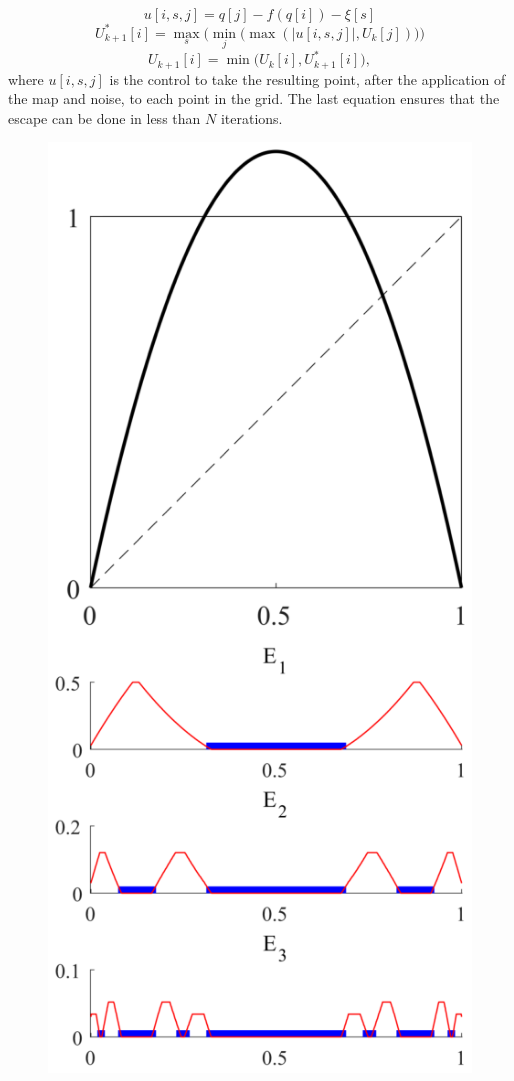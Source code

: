 \begin{equation*}
u[i,s,j] = q[j] - f(q[i]) - \xi[s]
\end{equation*}
\begin{equation*}
U^{*}_{k+1}[i]=\max_s\Big(\min_j\big(\max(|u[i,s,j]|,U_k[j])\big)\Big)
\end{equation*}
\begin{equation}
U_{k+1}[i]=\min\bigg(U_k[i],U^{*}_{k+1}[i]\bigg),
\label{equ:QuickEscapeFunctions}
\end{equation}
where $u[i,s,j]$ is the control to take the resulting point, after the application of the map and noise, to each point in the grid. The last equation ensures that the escape can be done in less than $N$ iterations.

\begin{figure}
    \centering
    \includegraphics[width=0.4\textheight]{Images/P1/EscapeSetsQuick.eps}

\end{figure}
